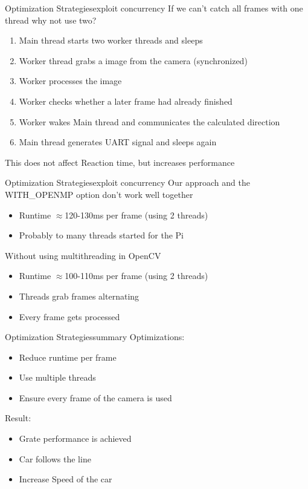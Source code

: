 \begin{frame}[plain]{Optimization Strategies}{exploit concurrency}
\pause
If we can't catch all frames with one thread why not use two?
\vspace{.5cm}
\begin{enumerate}
	\pause
	\item Main thread starts two worker threads and sleeps
	\pause
	\item Worker thread grabs a image from the camera (synchronized)
	\pause
	\item Worker processes the image 
	\pause
	\item Worker checks whether a later frame had already finished
	\pause
	\item Worker wakes Main thread and communicates the calculated direction
	\pause
	\item Main thread generates UART signal and sleeps again
\pause
\end{enumerate}
\vspace{.5cm}
This does not affect Reaction time, but increases performance
\end{frame}

\begin{frame}[plain]{Optimization Strategies}{exploit concurrency}
\pause
	Our approach and the WITH\_OPENMP option don't work well together
	\pause
		\begin{itemize}
			\item Runtime $\approx$120-130ms per frame (using 2 threads)
			\pause
			\item Probably to many threads started for the Pi
		\end{itemize}
		\pause
	Without using multithreading in OpenCV
		\begin{itemize}
		\pause
			\item Runtime $\approx$100-110ms per frame (using 2 threads)
			\pause
			\item Threads grab frames alternating
			\pause
			\item Every frame gets processed
		\end{itemize}
		
\end{frame}

\begin{frame}[plain]{Optimization Strategies}{summary}
	\large
	\pause
	Optimizations:
	\begin{itemize}
		\large
		\pause
		\item Reduce runtime per frame
		\pause
		\item Use multiple threads
		\pause
		\item Ensure every frame of the camera is used
	\end{itemize}
	\pause
	\vspace{1cm}
	Result: 
	\begin{itemize}
	\pause
		\item Grate performance is achieved
		\pause
		\item Car follows the line
		\pause
		\item Increase Speed of the car
	\end{itemize}			
\end{frame}